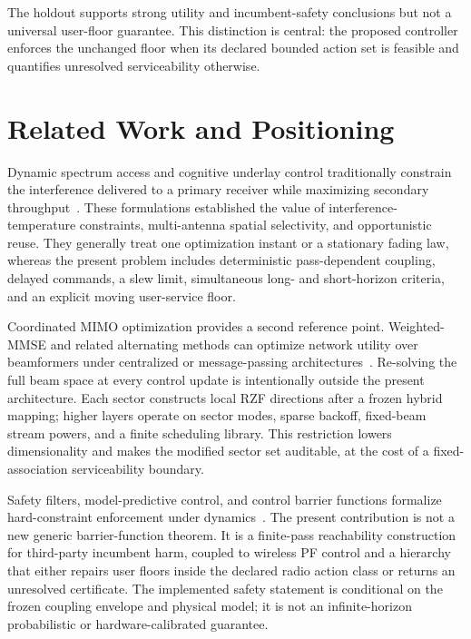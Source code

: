\documentclass[journal]{IEEEtran}
\begin{document}
The holdout supports strong utility and incumbent-safety conclusions but not a universal user-floor guarantee. This distinction is central: the proposed controller enforces the unchanged floor when its declared bounded action set is feasible and quantifies unresolved serviceability otherwise.

\section{Related Work and Positioning}
Dynamic spectrum access and cognitive underlay control traditionally constrain the interference delivered to a primary receiver while maximizing secondary throughput~\cite{zhao2007dsa,ghasemi2007limits,zhang2008multiantenna}. These formulations established the value of interference-temperature constraints, multi-antenna spatial selectivity, and opportunistic reuse. They generally treat one optimization instant or a stationary fading law, whereas the present problem includes deterministic pass-dependent coupling, delayed commands, a slew limit, simultaneous long- and short-horizon criteria, and an explicit moving user-service floor.

Coordinated MIMO optimization provides a second reference point. Weighted-MMSE and related alternating methods can optimize network utility over beamformers under centralized or message-passing architectures~\cite{christensen2008weighted,shi2011wmmse,wagner2012large}. Re-solving the full beam space at every control update is intentionally outside the present architecture. Each sector constructs local RZF directions after a frozen hybrid mapping; higher layers operate on sector modes, sparse backoff, fixed-beam stream powers, and a finite scheduling library. This restriction lowers dimensionality and makes the modified sector set auditable, at the cost of a fixed-association serviceability boundary.

Safety filters, model-predictive control, and control barrier functions formalize hard-constraint enforcement under dynamics~\cite{rawlings2017mpc,ames2017cbf,ames2019theory,agrawal2017dcbf,jankovic2018robust,xiao2022hocbf}. The present contribution is not a new generic barrier-function theorem. It is a finite-pass reachability construction for third-party incumbent harm, coupled to wireless PF control and a hierarchy that either repairs user floors inside the declared radio action class or returns an unresolved certificate. The implemented safety statement is conditional on the frozen coupling envelope and physical model; it is not an infinite-horizon probabilistic or hardware-calibrated guarantee.
\end{document}
